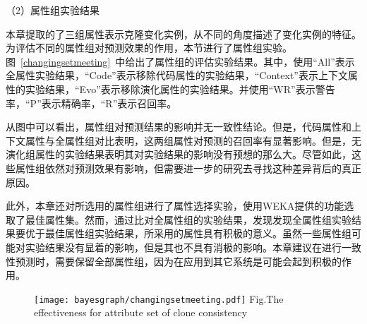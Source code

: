 
（2）属性组实验结果

本章提取的了三组属性表示克隆变化实例，从不同的角度描述了变化实例的特征。为评估不同的属性组对预测效果的作用，本节进行了属性组实验。图~\ref{changingsetmeeting}~中给出了属性组的评估实验结果。其中，使用“All”表示全属性实验结果，“Code”表示移除代码属性的实验结果，“Context”表示上下文属性的实验结果，“Evo”表示移除演化属性的实验结果。并使用“WR”表示警告率，“P”表示精确率，“R”表示召回率。

从图中可以看出，属性组对预测结果的影响并无一致性结论。但是，代码属性和上下文属性与全属性组对比表明，这两组属性对预测的召回率有显著影响。但是，无演化组属性的实验结果表明其对实验结果的影响没有预想的那么大。尽管如此，这些属性组依然对预测效果有影响，但需要进一步的研究去寻找这种差异背后的真正原因。

此外，本章还对所选用的属性组进行了属性选择实验，使用WEKA提供的功能选取了最佳属性集。然而，通过比对全属性组的实验结果，发现发现全属性组实验结果要优于最佳属性组实验结果，所采用的属性具有积极的意义。虽然一些属性组可能对实验结果没有显着的影响，但是其也不具有消极的影响。本章建议在进行一致性预测时，需要保留全部属性组，因为在应用到其它系统是可能会起到积极的作用。

\begin{figure}[htbp]
\centering
\texttt{[image: bayesgraph/changingsetmeeting.pdf]}
{Fig.$\!$}{The effectiveness for attribute set of clone consistency}
\vspace{-1em}
\end{figure}

